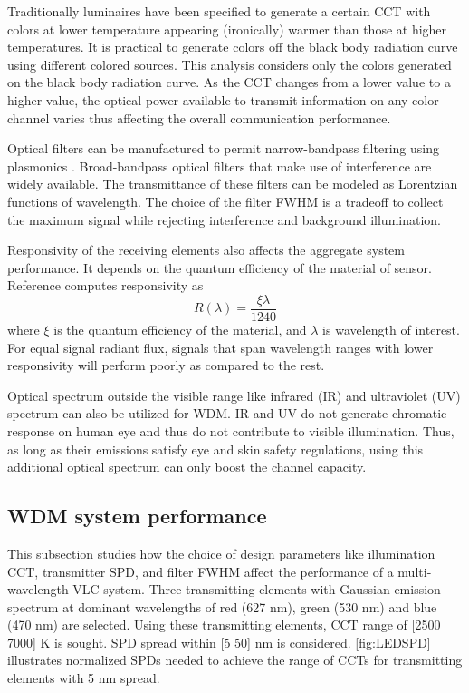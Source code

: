 Traditionally luminaires have been specified to generate a certain CCT with colors at lower temperature appearing (ironically) warmer than those at higher temperatures. It is practical to generate colors off the black body radiation curve using different colored sources. This analysis considers only the colors generated on the black body radiation curve. As the CCT changes from a lower value to a higher value, the optical power available to transmit information on any color channel varies thus affecting the overall communication performance.

Optical filters can be manufactured to permit narrow-bandpass filtering using plasmonics \cite{xu10a,yok12a}. Broad-bandpass optical filters that make use of interference are widely available. The transmittance of these filters can be modeled as Lorentzian functions of wavelength. The choice of the filter FWHM is a tradeoff to collect the maximum signal while rejecting interference and background illumination.

Responsivity of the receiving elements also affects the aggregate system performance. It depends on the quantum efficiency of the material of sensor. Reference \cite{gha12a} computes responsivity as
\begin{equation}
\label{eqResponsivity}
	 R(\lambda) = \frac{\xi\lambda}{1240}
\end{equation}
where $\xi$ is the quantum efficiency of the material, and $\lambda$ is wavelength of interest. For equal signal radiant flux, signals that span wavelength ranges with lower responsivity will perform poorly as compared to the rest. 

Optical spectrum outside the visible range like infrared (IR) and ultraviolet (UV) spectrum can also be utilized for WDM. IR and UV do not generate chromatic response on human eye and thus do not contribute to visible illumination. Thus, as long as their emissions satisfy eye and skin safety regulations, using this additional optical spectrum can only boost the channel capacity.

\subsection{WDM system performance}
\label{subsec:wdmSystemAnalysis}
This subsection studies how the choice of design parameters like illumination CCT, transmitter SPD, and filter FWHM affect the performance of a multi-wavelength VLC system. Three transmitting elements with Gaussian emission spectrum at dominant wavelengths of red (627 nm), green (530 nm) and blue (470 nm) are selected. Using these transmitting elements, CCT range of [2500 7000] K is sought. SPD spread within [5 50] nm is considered. \figurename{ \ref{fig:LEDSPD}} illustrates normalized SPDs needed to achieve the range of CCTs for transmitting elements with 5 nm spread.

